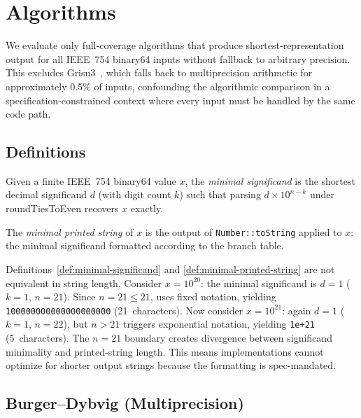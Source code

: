 \section{Algorithms}
\label{sec:algorithms}

We evaluate only full-coverage algorithms that produce shortest-representation
output for all IEEE~754 binary64 inputs without fallback to arbitrary
precision.  This excludes Grisu3~\cite{loitsch2010grisu}, which falls back
to multiprecision arithmetic for approximately 0.5\% of inputs,
confounding the algorithmic comparison in a specification-constrained
context where every input must be handled by the same code path.

\subsection{Definitions}

\begin{definition}
\label{def:minimal-significand}
Given a finite IEEE~754 binary64 value $x$, the \emph{minimal
significand} is the shortest decimal significand $d$ (with digit count
$k$) such that parsing $d \times 10^{n-k}$ under roundTiesToEven
recovers $x$ exactly.
\end{definition}

\begin{definition}
\label{def:minimal-printed-string}
The \emph{minimal printed string} of $x$ is the output of \ecma
\texttt{Number::toString} applied to $x$: the minimal significand
formatted according to the \ecma branch table.
\end{definition}

\begin{remark}
Definitions~\ref{def:minimal-significand} and
\ref{def:minimal-printed-string} are not equivalent in string length.
Consider $x = 10^{20}$: the minimal significand is
$d = 1$ ($k = 1$, $n = 21$).  Since $n = 21 \leq 21$, \ecma uses fixed
notation, yielding \texttt{100000000000000000000} (21~characters).  Now
consider $x = 10^{21}$: again $d = 1$ ($k = 1$, $n = 22$), but $n > 21$
triggers exponential notation, yielding \texttt{1e+21} (5~characters).
The $n = 21$ boundary creates divergence between significand minimality
and printed-string length.  This means implementations cannot optimize
for shorter output strings because the \ecma formatting is spec-mandated.
\end{remark}

\subsection{Burger--Dybvig (Multiprecision)}

